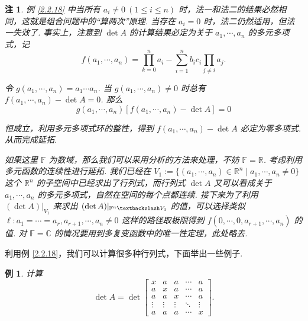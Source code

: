\documentclass[10pt,openany]{article}
\theoremstyle{thmstyle} %
\theoremstyle{defstyle} %
\theoremstyle{prostyle} %
\theoremstyle{exastyle}
\newtheorem{example}[theorem]{例}
\theoremstyle{remstyle}
\newtheorem{remark}[theorem]{注}
\newcommand{\F}{\mathbb{F}}
\newcommand{\C}{\mathbb{C}}
\newcommand{\R}{\mathbb{R}}
\begin{document}
\begin{remark} \label{2.2.19}
	例 \ref{2.2.18} 中当所有 \( a_i \neq 0 \ (1 \leq i \leq n) \) 时，法一和法二的结果必然相同，这就是组合问题中的“算两次”原理. 当存在 \( a_i =0 \) 时，法二仍然适用，但法一失效了. 事实上，注意到 \( \det A \) 的计算结果必定为关于 \( a_1,\cdots,a_n \) 的多元多项式，记
	\[ f(a_1,\cdots,a_n)=\prod_{k=0}^{n} a_i-\sum_{i=1}^{n} b_ic_i \prod_{j \neq i}^{} a_j. \]
	
	令 \( g(a_1,\cdots,a_n)=a_1\cdots a_n \). 当 \( g(a_1,\cdots,a_n) \neq 0 \) 时总有 \( f(a_1,\cdots,a_n)-\det A=0 \). 那么
	\[ g(a_1,\cdots,a_n)[f(a_1,\cdots,a_n)-\det A]=0 \] 
	
	恒成立，利用多元多项式环的整性，得到 \( f(a_1,\cdots,a_n)-\det A \) 必定为零多项式. 从而完成延拓. 
	
	如果这里 \( \F \) 为数域，那么我们可以采用分析的方法来处理，不妨 \( \F=\R \). 考虑利用多元函数的连续性进行延拓. 我们已经在 \( V_1:=\{ (a_1,\cdots,a_n) \in \R^n \mid a_1,\cdots,a_n \neq 0 \} \) 这个 \( \R^n \) 的子空间中已经求出了行列式，而行列式 \( \det A \) 又可以看成关于 \( a_1,\cdots,a_n \) 的多元多项式，自然在空间的每个点都连续. 接下来为了利用 \( (\det A)|_{V_1} \) 来求出 \( (\det A)|_{\mathbb{F}^n\textbackslash V_1} \) 的值，可以选择类似 \( \ell: a_1=\cdots=a_r, a_{r+1}, \cdots, a_n \neq 0 \) 这样的路径取极限得到 \( f(0,\cdots,0,a_{r+1},\cdots,a_n) \) 的值. 对 \( \F =\C \) 的情况要用到多复变函数中的唯一性定理，此处略去.
\end{remark}

\vspace{1ex}

利用例 \ref{2.2.18}，我们可以计算很多种行列式，下面举出一些例子.

\begin{example}	\label{2.2.20}
	计算 \[
	\det A= \det \begin{bmatrix}
		x & a & a & \cdots & a \\
		a & x & a & \cdots & a \\
		a & a & x & \cdots & a \\
		\vdots & \vdots & \vdots & \ddots & \vdots \\
		a & a & a & \cdots & x
	\end{bmatrix}.
	\]

\end{example}
\end{document}

